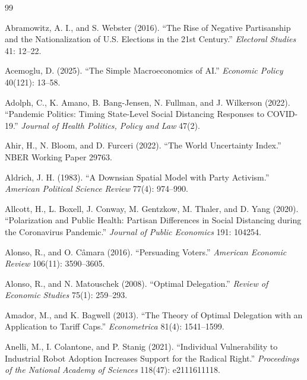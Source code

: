 \documentclass[12pt,letterpaper]{article}
\begin{document}
\clearpage
\begin{thebibliography}{99}
\setlength{\itemsep}{2pt}

Abramowitz, A. I., and S. Webster (2016). ``The Rise of Negative Partisanship and the Nationalization of U.S. Elections in the 21st Century.'' \textit{Electoral Studies} 41: 12--22.

Acemoglu, D. (2025). ``The Simple Macroeconomics of AI.'' \textit{Economic Policy} 40(121): 13--58.

Adolph, C., K. Amano, B. Bang-Jensen, N. Fullman, and J. Wilkerson (2022). ``Pandemic Politics: Timing State-Level Social Distancing Responses to COVID-19.'' \textit{Journal of Health Politics, Policy and Law} 47(2).

Ahir, H., N. Bloom, and D. Furceri (2022). ``The World Uncertainty Index.'' NBER Working Paper 29763.

Aldrich, J. H. (1983). ``A Downsian Spatial Model with Party Activism.'' \textit{American Political Science Review} 77(4): 974--990.

Allcott, H., L. Boxell, J. Conway, M. Gentzkow, M. Thaler, and D. Yang (2020). ``Polarization and Public Health: Partisan Differences in Social Distancing during the Coronavirus Pandemic.'' \textit{Journal of Public Economics} 191: 104254.

Alonso, R., and O. C\^{a}mara (2016). ``Persuading Voters.'' \textit{American Economic Review} 106(11): 3590--3605.

Alonso, R., and N. Matouschek (2008). ``Optimal Delegation.'' \textit{Review of Economic Studies} 75(1): 259--293.

Amador, M., and K. Bagwell (2013). ``The Theory of Optimal Delegation with an Application to Tariff Caps.'' \textit{Econometrica} 81(4): 1541--1599.

Anelli, M., I. Colantone, and P. Stanig (2021). ``Individual Vulnerability to Industrial Robot Adoption Increases Support for the Radical Right.'' \textit{Proceedings of the National Academy of Sciences} 118(47): e2111611118.


\end{thebibliography}
\end{document}
